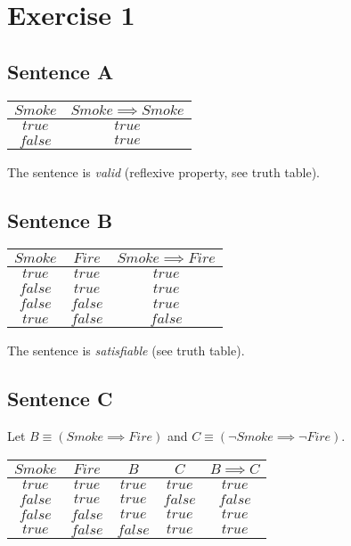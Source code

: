 \section*{Exercise 1}

\subsection*{Sentence A}

\begin{center}
\begin{tabular}{| c | c |}
\hline
$Smoke$ & $Smoke \implies Smoke$ \\
\hline
$true$ & $true$ \\
\hline
$false$ & $true$ \\
\hline
\end{tabular}
\end{center}

The sentence is \textit{valid} (reflexive property, see truth table).

\subsection*{Sentence B}

\begin{center}
\begin{tabular}{| c | c | c |}
\hline
$Smoke$ & $Fire$ & $Smoke \implies Fire$ \\
\hline
$true$ & $true$ & $true$ \\
\hline
$false$ & $true$ & $true$ \\
\hline
$false$ & $false$ & $true$ \\
\hline
$true$ & $false$ & $false$ \\
\hline
\end{tabular}
\end{center}

The sentence is \textit{satisfiable} (see truth table).

\subsection*{Sentence C}

Let $B \equiv (Smoke \implies Fire)$ and $C \equiv (\neg Smoke \implies \neg Fire)$.

\begin{center}
\begin{tabular}{| c | c | c | c | c |}
\hline
$Smoke$ & $Fire$ & $B$ & $C$ & $B \implies C$  \\
\hline
$true$ & $true$ & $true$ & $true$ & $true$ \\
\hline
$false$ & $true$ & $true$ & $false$ & $false$ \\
\hline
$false$ & $false$ & $true$ & $true$ & $true$ \\
\hline
$true$ & $false$ & $false$ & $true$ & $true$ \\
\hline
\end{tabular}
\end{center}


